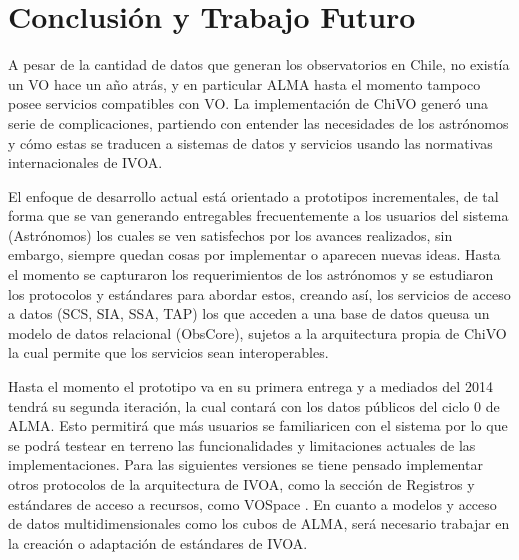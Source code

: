 \section{Conclusión y Trabajo Futuro}
A pesar de la cantidad de datos que generan los observatorios en Chile, no
existía un VO hace un año atrás, y en particular ALMA hasta el momento tampoco
posee servicios compatibles con VO. La implementación de ChiVO generó una serie
de complicaciones, partiendo con entender las necesidades de los astrónomos y
cómo estas se traducen a sistemas de datos y servicios usando las normativas
internacionales de IVOA. 

El enfoque de desarrollo actual está orientado a prototipos incrementales, de
tal forma que se van generando entregables frecuentemente a los usuarios del
sistema (Astrónomos) los cuales se ven satisfechos por los avances realizados,
sin embargo, siempre quedan cosas por implementar o aparecen nuevas ideas.
Hasta el momento se capturaron los requerimientos de los astrónomos y se
estudiaron los protocolos y estándares para abordar estos, creando así, los
servicios de acceso a datos (SCS, SIA, SSA, TAP) los que acceden a una base de
datos queusa  un modelo de datos relacional (ObsCore), sujetos a la
arquitectura propia de ChiVO la cual permite que los servicios sean
interoperables.

Hasta el momento el prototipo va en su primera entrega y a mediados del 2014
tendrá su segunda iteración, la cual contará con los datos públicos del ciclo 0
de ALMA. Esto permitirá que más usuarios se familiaricen con el sistema por lo
que se podrá testear en terreno las funcionalidades y limitaciones actuales de
las implementaciones. Para las siguientes versiones se tiene pensado
implementar otros protocolos de la arquitectura de IVOA, como la sección de
Registros y estándares de acceso a recursos, como VOSpace
\cite{graham2007vospace}. En cuanto a modelos y acceso de datos
multidimensionales como los cubos de ALMA, será necesario trabajar en la
creación o adaptación de estándares de IVOA. 
